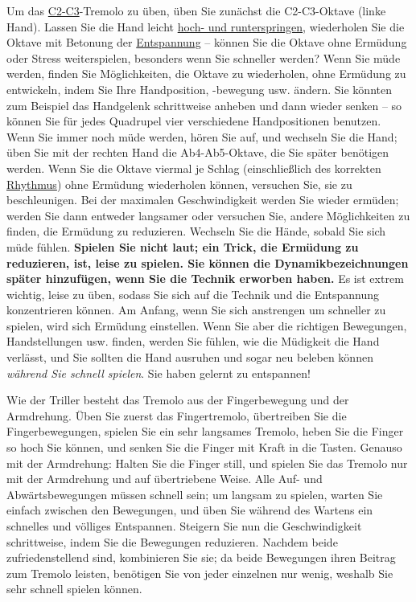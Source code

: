 Um das \hyperref[Noten]{C2-C3}-Tremolo zu üben, üben Sie zunächst die C2-C3-Oktave (linke Hand).
Lassen Sie die Hand leicht \hyperref[c1ii9]{hoch- und runterspringen}, wiederholen Sie die Oktave mit Betonung der \hyperref[c1ii14]{Entspannung} -- können Sie die Oktave ohne Ermüdung oder Stress weiterspielen, besonders wenn Sie schneller werden?
Wenn Sie müde werden, finden Sie Möglichkeiten, die Oktave zu wiederholen, ohne Ermüdung zu entwickeln, indem Sie Ihre Handposition, -bewegung usw. ändern.
Sie könnten zum Beispiel das Handgelenk schrittweise anheben und dann wieder senken -- so können Sie für jedes Quadrupel vier verschiedene Handpositionen benutzen.
Wenn Sie immer noch müde werden, hören Sie auf, und wechseln Sie die Hand; üben Sie mit der rechten Hand die Ab4-Ab5-Oktave, die Sie später benötigen werden.
Wenn Sie die Oktave viermal je Schlag (einschließlich des korrekten \hyperref[c1iii1b]{Rhythmus}) ohne Ermüdung wiederholen können, versuchen Sie, sie zu beschleunigen.
Bei der maximalen Geschwindigkeit werden Sie wieder ermüden; werden Sie dann entweder langsamer oder versuchen Sie, andere Möglichkeiten zu finden, die Ermüdung zu reduzieren.
Wechseln Sie die Hände, sobald Sie sich müde fühlen.
\textbf{Spielen Sie nicht laut; ein Trick, die Ermüdung zu reduzieren, ist, leise zu spielen.
Sie können die Dynamikbezeichnungen später hinzufügen, wenn Sie die Technik erworben haben.}
Es ist extrem wichtig, leise zu üben, sodass Sie sich auf die Technik und die Entspannung konzentrieren können.
Am Anfang, wenn Sie sich anstrengen um schneller zu spielen, wird sich Ermüdung einstellen.
Wenn Sie aber die richtigen Bewegungen, Handstellungen usw. finden, werden Sie fühlen, wie die Müdigkeit die Hand verlässt, und Sie sollten die Hand ausruhen und sogar neu beleben können \textit{während Sie schnell spielen}.
Sie haben gelernt zu entspannen!

Wie der Triller besteht das Tremolo aus der Fingerbewegung und der Armdrehung.
Üben Sie zuerst das Fingertremolo, übertreiben Sie die Fingerbewegungen, spielen Sie ein sehr langsames Tremolo, heben Sie die Finger so hoch Sie können, und senken Sie die Finger mit Kraft in die Tasten.
Genauso mit der Armdrehung: Halten Sie die Finger still, und spielen Sie das Tremolo nur mit der Armdrehung und auf übertriebene Weise.
Alle Auf- und Abwärtsbewegungen müssen schnell sein; um langsam zu spielen, warten Sie einfach zwischen den Bewegungen, und üben Sie während des Wartens ein schnelles und völliges Entspannen.
Steigern Sie nun die Geschwindigkeit schrittweise, indem Sie die Bewegungen reduzieren.
Nachdem beide zufriedenstellend sind, kombinieren Sie sie; da beide Bewegungen ihren Beitrag zum Tremolo leisten, benötigen Sie von jeder einzelnen nur wenig, weshalb Sie sehr schnell spielen können.

